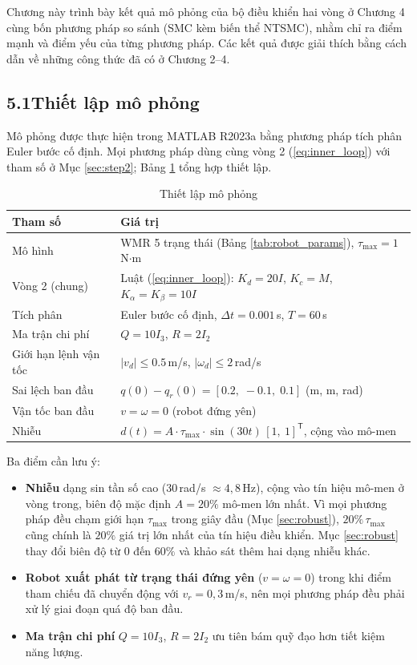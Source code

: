 \documentclass[12pt,a4paper]{article}
\newcommand{\T}{\mathsf{T}}
\begin{document}
Chương này trình bày kết quả mô phỏng của bộ điều khiển hai vòng ở Chương 4 cùng bốn phương pháp so sánh (SMC kèm biến thể NTSMC), nhằm chỉ ra điểm mạnh và điểm yếu của từng phương pháp. Các kết quả được giải thích bằng cách dẫn về những công thức đã có ở Chương 2--4.

\subsection*{5.1\quad Thiết lập mô phỏng}

Mô phỏng được thực hiện trong MATLAB R2023a bằng phương pháp tích phân Euler bước cố định. Mọi phương pháp dùng cùng vòng 2 (\ref{eq:inner_loop}) với tham số ở Mục \ref{sec:step2}; Bảng \ref{tab:sim_setup} tổng hợp thiết lập.

\begin{table}[H]
\centering
\caption{Thiết lập mô phỏng}
\label{tab:sim_setup}
\begin{tabular}{ll}
\toprule
\textbf{Tham số} & \textbf{Giá trị} \\
\midrule
Mô hình & WMR 5 trạng thái (Bảng \ref{tab:robot_params}), $\tau_\text{max} = 1$\,N$\cdot$m \\
Vòng 2 (chung) & Luật (\ref{eq:inner_loop}): $K_d = 20I$, $K_c = M$, $K_\alpha = K_\beta = 10I$ \\
Tích phân & Euler bước cố định, $\Delta t = 0.001$\,s, $T = 60$\,s \\
Ma trận chi phí & $Q = 10 I_3$, $R = 2 I_2$ \\
Giới hạn lệnh vận tốc & $|v_d| \leq 0.5$\,m/s, $|\omega_d| \leq 2$\,rad/s \\
Sai lệch ban đầu & $q(0) - q_r(0) = [0.2,\; -0.1,\; 0.1]$ (m, m, rad) \\
Vận tốc ban đầu & $v = \omega = 0$ (robot đứng yên) \\
Nhiễu & $d(t) = A \cdot \tau_\text{max} \cdot \sin(30t)\,[1,\ 1]^\T$, cộng vào mô-men \\
\bottomrule
\end{tabular}
\end{table}

Ba điểm cần lưu ý:
\begin{itemize}
    \item \textbf{Nhiễu} dạng sin tần số cao ($30$\,rad/s $\approx 4{,}8$\,Hz), cộng vào tín hiệu mô-men ở vòng trong, biên độ mặc định $A = 20\%$ mô-men lớn nhất. Vì mọi phương pháp đều chạm giới hạn $\tau_\text{max}$ trong giây đầu (Mục \ref{sec:robust}), $20\%\,\tau_\text{max}$ cũng chính là $20\%$ giá trị lớn nhất của tín hiệu điều khiển. Mục \ref{sec:robust} thay đổi biên độ từ $0$ đến $60\%$ và khảo sát thêm hai dạng nhiễu khác.
    \item \textbf{Robot xuất phát từ trạng thái đứng yên} ($v = \omega = 0$) trong khi điểm tham chiếu đã chuyển động với $v_r = 0{,}3$\,m/s, nên mọi phương pháp đều phải xử lý giai đoạn quá độ ban đầu.
    \item \textbf{Ma trận chi phí} $Q = 10I_3$, $R = 2I_2$ ưu tiên bám quỹ đạo hơn tiết kiệm năng lượng.
\end{itemize}
\end{document}
